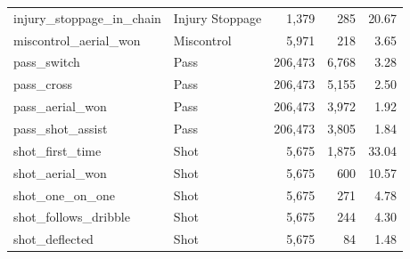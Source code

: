 {\begin{longtable}{llrrr}
injury\_stoppage\_in\_chain & Injury Stoppage & 1,379 & 285 & 20.67 \\
miscontrol\_aerial\_won & Miscontrol & 5,971 & 218 & 3.65 \\
pass\_switch & Pass & 206,473 & 6,768 & 3.28 \\
pass\_cross & Pass & 206,473 & 5,155 & 2.50 \\
pass\_aerial\_won & Pass & 206,473 & 3,972 & 1.92 \\
pass\_shot\_assist & Pass & 206,473 & 3,805 & 1.84 \\
shot\_first\_time & Shot & 5,675 & 1,875 & 33.04 \\
shot\_aerial\_won & Shot & 5,675 & 600 & 10.57 \\
shot\_one\_on\_one & Shot & 5,675 & 271 & 4.78 \\
shot\_follows\_dribble & Shot & 5,675 & 244 & 4.30 \\
shot\_deflected & Shot & 5,675 & 84 & 1.48 \\
\end{longtable}
}